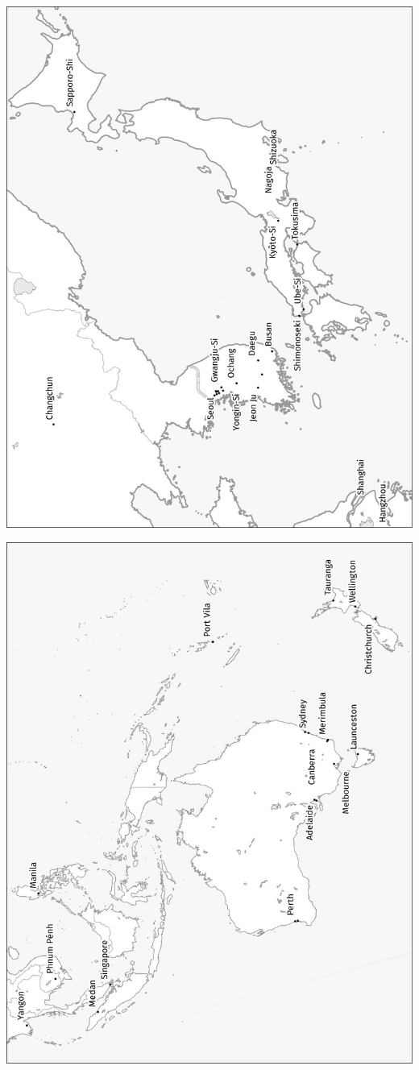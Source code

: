 \begin{minipage}{\textwidth} \includegraphics[width=\textwidth]{maps/JP.jpg} \end{minipage}
\begin{minipage}{\textwidth} \includegraphics[width=\textwidth]{maps/Oceanio.jpg} \end{minipage}

